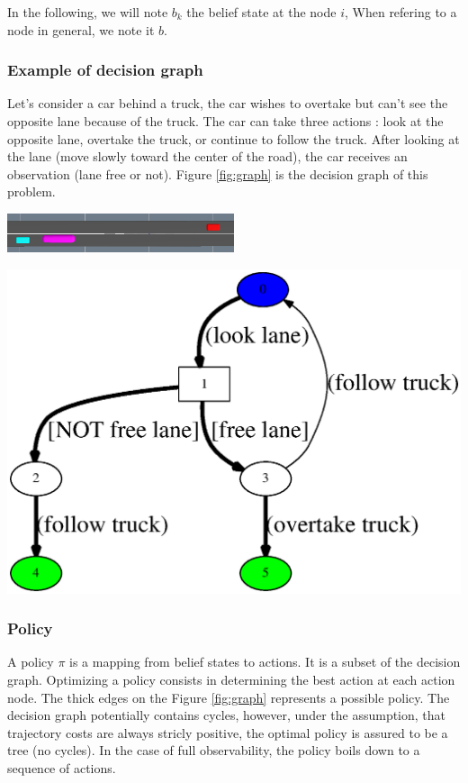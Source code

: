 \documentclass[conference]{IEEEtran}
\begin{document}
In the following, we will note $b_k$ the belief state at the node $i$, When refering to a node in general, we note it $b$.\\
\subsubsection{Example of decision graph}

Let's consider a car behind a truck, the car wishes to overtake but can't see the opposite lane because of the truck. The car can take three actions : look at the opposite lane, overtake the truck, or continue to follow the truck. After looking at the lane (move slowly toward the center of the road), the car receives an observation (lane free or not). Figure \ref{fig:graph} is the decision graph of this problem.

  \begin{center}
  \includegraphics[width=0.5\textwidth]{images/overtaking.png}
  \label{fig:overtaking-decision-graph}
    \end{center}
    
  \begin{center}
  \includegraphics[height=0.25\textwidth]{images/graph.eps}
  \label{fig:graph}
    \end{center}

\subsubsection{Policy}
A policy $\pi$ is a mapping from belief states to actions. It is a subset of the decision graph. Optimizing a policy consists in determining the best action at each action node. The thick edges on the Figure \ref{fig:graph} represents a possible policy. The decision graph potentially contains cycles, however, under the assumption, that trajectory costs are always stricly positive, the optimal policy is assured to be a tree (no cycles). In the case of full observability, the policy boils down to a sequence of actions. \\
\end{document}

